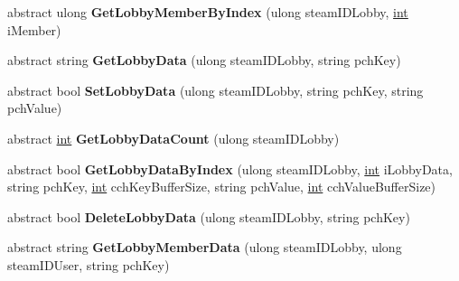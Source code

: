\begin{DoxyCompactItemize}
\item 
\hypertarget{classValve_1_1Steamworks_1_1ISteamMatchmaking_a9b258de9592d2a3911c3c83cdb83a4bf}{}abstract ulong {\bfseries Get\+Lobby\+Member\+By\+Index} (ulong steam\+I\+D\+Lobby, \hyperlink{SDL__thread_8h_a6a64f9be4433e4de6e2f2f548cf3c08e}{int} i\+Member)\label{classValve_1_1Steamworks_1_1ISteamMatchmaking_a9b258de9592d2a3911c3c83cdb83a4bf}

\item 
\hypertarget{classValve_1_1Steamworks_1_1ISteamMatchmaking_a7d9a66e6f55a1792d741f1444fb901c4}{}abstract string {\bfseries Get\+Lobby\+Data} (ulong steam\+I\+D\+Lobby, string pch\+Key)\label{classValve_1_1Steamworks_1_1ISteamMatchmaking_a7d9a66e6f55a1792d741f1444fb901c4}

\item 
\hypertarget{classValve_1_1Steamworks_1_1ISteamMatchmaking_aadce862e0242b1738d45bed4749bf2f8}{}abstract bool {\bfseries Set\+Lobby\+Data} (ulong steam\+I\+D\+Lobby, string pch\+Key, string pch\+Value)\label{classValve_1_1Steamworks_1_1ISteamMatchmaking_aadce862e0242b1738d45bed4749bf2f8}

\item 
\hypertarget{classValve_1_1Steamworks_1_1ISteamMatchmaking_a7990565d56a4a0b88c219759fa9ba98c}{}abstract \hyperlink{SDL__thread_8h_a6a64f9be4433e4de6e2f2f548cf3c08e}{int} {\bfseries Get\+Lobby\+Data\+Count} (ulong steam\+I\+D\+Lobby)\label{classValve_1_1Steamworks_1_1ISteamMatchmaking_a7990565d56a4a0b88c219759fa9ba98c}

\item 
\hypertarget{classValve_1_1Steamworks_1_1ISteamMatchmaking_a14891917d2f464e84f874f1c39169955}{}abstract bool {\bfseries Get\+Lobby\+Data\+By\+Index} (ulong steam\+I\+D\+Lobby, \hyperlink{SDL__thread_8h_a6a64f9be4433e4de6e2f2f548cf3c08e}{int} i\+Lobby\+Data, string pch\+Key, \hyperlink{SDL__thread_8h_a6a64f9be4433e4de6e2f2f548cf3c08e}{int} cch\+Key\+Buffer\+Size, string pch\+Value, \hyperlink{SDL__thread_8h_a6a64f9be4433e4de6e2f2f548cf3c08e}{int} cch\+Value\+Buffer\+Size)\label{classValve_1_1Steamworks_1_1ISteamMatchmaking_a14891917d2f464e84f874f1c39169955}

\item 
\hypertarget{classValve_1_1Steamworks_1_1ISteamMatchmaking_aa1fa5686af31f7eac9d2855ab172acde}{}abstract bool {\bfseries Delete\+Lobby\+Data} (ulong steam\+I\+D\+Lobby, string pch\+Key)\label{classValve_1_1Steamworks_1_1ISteamMatchmaking_aa1fa5686af31f7eac9d2855ab172acde}

\item 
\hypertarget{classValve_1_1Steamworks_1_1ISteamMatchmaking_a032e962fc5fc1df63614290e10a1eae7}{}abstract string {\bfseries Get\+Lobby\+Member\+Data} (ulong steam\+I\+D\+Lobby, ulong steam\+I\+D\+User, string pch\+Key)\label{classValve_1_1Steamworks_1_1ISteamMatchmaking_a032e962fc5fc1df63614290e10a1eae7}


\end{DoxyCompactItemize}
